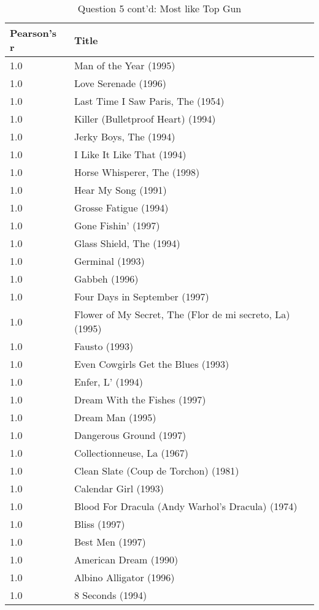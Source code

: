 \clearpage

\begin{table}[h!]
\centering
\begin{tabular}{| l | l |}
\hline
Pearson's r & Title \\
\hline
1.0 & Man of the Year (1995) \\
1.0 & Love Serenade (1996) \\
1.0 & Last Time I Saw Paris, The (1954) \\
1.0 & Killer (Bulletproof Heart) (1994) \\
1.0 & Jerky Boys, The (1994) \\
1.0 & I Like It Like That (1994) \\
1.0 & Horse Whisperer, The (1998) \\
1.0 & Hear My Song (1991) \\
1.0 & Grosse Fatigue (1994) \\
1.0 & Gone Fishin' (1997) \\
1.0 & Glass Shield, The (1994) \\
1.0 & Germinal (1993) \\
1.0 & Gabbeh (1996) \\
1.0 & Four Days in September (1997) \\
1.0 & Flower of My Secret, The (Flor de mi secreto, La) (1995) \\
1.0 & Fausto (1993) \\
1.0 & Even Cowgirls Get the Blues (1993) \\
1.0 & Enfer, L' (1994) \\
1.0 & Dream With the Fishes (1997) \\
1.0 & Dream Man (1995) \\
1.0 & Dangerous Ground (1997) \\
1.0 & Collectionneuse, La (1967) \\
1.0 & Clean Slate (Coup de Torchon) (1981) \\
1.0 & Calendar Girl (1993) \\
1.0 & Blood For Dracula (Andy Warhol's Dracula) (1974) \\
1.0 & Bliss (1997) \\
1.0 & Best Men (1997) \\
1.0 & American Dream (1990) \\
1.0 & Albino Alligator (1996) \\
1.0 & 8 Seconds (1994) \\
\hline
\end{tabular}
\caption{Question 5 cont'd: Most like Top Gun}
\label{tab:mltg2}
\end{table}


